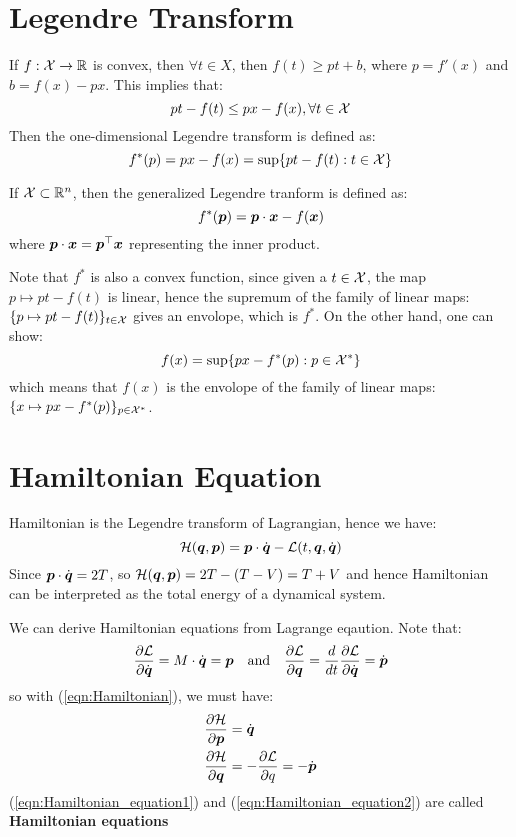 \documentclass[hidelinks]{article}[12pt]
\begin{document}
\section{Legendre Transform}
If $f: {\cal X} \to \mathbb R$ is convex, then $\forall t \in X$, then $f(t) \geq pt + b$, where $p = f'(x)$ and $b = f(x) - px$. This implies that:
\[pt - f(t) \leq px -f(x), \forall t \in {\cal X}\]
Then the one-dimensional Legendre transform is defined as: 
\[f^*(p) = px - f(x) = \sup\{pt - f(t) : t \in {\cal X}\}\]

If ${\cal X} \subset \mathbb R^n$, then the generalized Legendre tranform is defined as:
\[f^*(\boldsymbol{p}) = \boldsymbol{p} \cdot \boldsymbol{x} - f(\boldsymbol{x})\]where $\boldsymbol{p} \cdot \boldsymbol{x} = \boldsymbol{p}^{\top} \boldsymbol{x}$ representing the inner product. 

Note that $f^*$ is also a convex function, since given a $t \in {\cal X}$, the map $p \mapsto pt -f(t)$ is linear, hence the supremum of the family of linear maps: $\{p \mapsto pt-f(t)\}_{t \in {\cal X}}$ gives an envolope, which is $f^*$. On the other hand, one can show:
\[f(x) = \sup\{px - f^*(p) : p \in {\cal X}^*\}\]
which means that $f(x)$ is the envolope of the family of linear maps: $\{x \mapsto px - f^*(p)\}_{p \in {\cal X}^*}$. 



\section{Hamiltonian Equation}
Hamiltonian is the Legendre transform of Lagrangian, hence we have:
\begin{equation}
{\cal H}(\boldsymbol{q}, \boldsymbol{p}) = \boldsymbol{p} \cdot \dot{\boldsymbol{q}} - {\cal L}(t, \boldsymbol{q}, \dot{\boldsymbol{q}}) \label{eqn:Hamiltonian}
\end{equation}
Since $\boldsymbol{p}\cdot \dot{\boldsymbol{q}} = 2T$, so ${\cal H}(\boldsymbol{q}, \boldsymbol{p}) = 2T - (T - V) = T + V$ and hence Hamiltonian can be interpreted as the total energy of a dynamical system.


We can derive Hamiltonian equations from Lagrange eqaution. Note that:\[\frac{\partial{{\cal L}}}{\partial{\dot{\boldsymbol{q}}}} = M\cdot\dot{\boldsymbol{q}} = \boldsymbol{p} \quad \text{and} \quad \frac{\partial{{\cal L}}}{\partial{\boldsymbol{q}}} = \frac{d}{dt}\frac{\partial{{\cal L}}}{\partial{\dot{\boldsymbol{q}}}} = \dot{\boldsymbol{p}}\]
so with (\ref{eqn:Hamiltonian}), we must have:
\begin{align}
& \frac{\partial{{\cal H}}}{\partial{\boldsymbol{p}}} = \dot{\boldsymbol{q}} \label{eqn:Hamiltonian_equation1}\\
& \frac{\partial{{\cal H}}}{\partial{\boldsymbol{q}}} = -\frac{\partial{{\cal L}}}{\partial{q}} = - \dot{\boldsymbol{p}} \label{eqn:Hamiltonian_equation2}
\end{align}
(\ref{eqn:Hamiltonian_equation1}) and (\ref{eqn:Hamiltonian_equation2}) are called \textbf{Hamiltonian equations}
\end{document}

